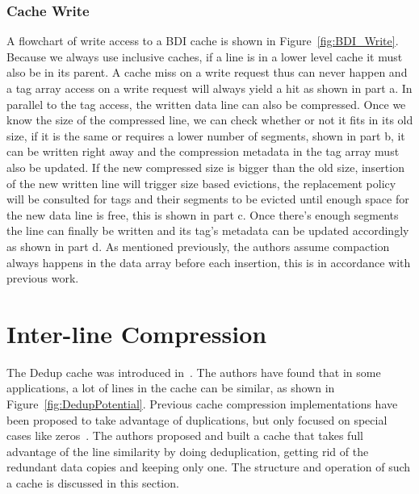 \subsubsection{Cache Write}
A flowchart of write access to a BDI cache is shown in Figure~\ref{fig:BDI_Write}. Because we always use inclusive caches, if a line is in a lower level cache it must also be in its parent. A cache miss on a write request thus can never happen and a tag array access on a write request will always yield a hit as shown in part a. In parallel to the tag access, the written data line can also be compressed. Once we know the size of the compressed line, we can check whether or not it fits in its old size, if it is the same or requires a lower number of segments, shown in part b, it can be written right away and the compression metadata in the tag array must also be updated. If the new compressed size is bigger than the old size, insertion of the new written line will trigger size based evictions, the replacement policy will be consulted for tags and their segments to be evicted until enough space for the new data line is free, this is shown in part c. Once there's enough segments the line can finally be written and its tag's metadata can be updated accordingly as shown in part d.
As mentioned previously, the authors assume compaction always happens in the data array before each insertion, this is in accordance with previous work.

\section{Inter-line Compression}
\label{sec:Dedup}
The Dedup cache was introduced in~\cite{dedup}. The authors have found that in some applications, a lot of lines in the cache can be similar, as shown in Figure~\ref{fig:DedupPotential}. Previous cache compression implementations have been proposed to take advantage of duplications, but only focused on special cases like zeros~\cite{alameldeen2004adaptive, dusser2009zero}. The authors proposed and built a cache that takes full advantage of the line similarity by doing deduplication, getting rid of the redundant data copies and keeping only one. The structure and operation of such a cache is discussed in this section.
